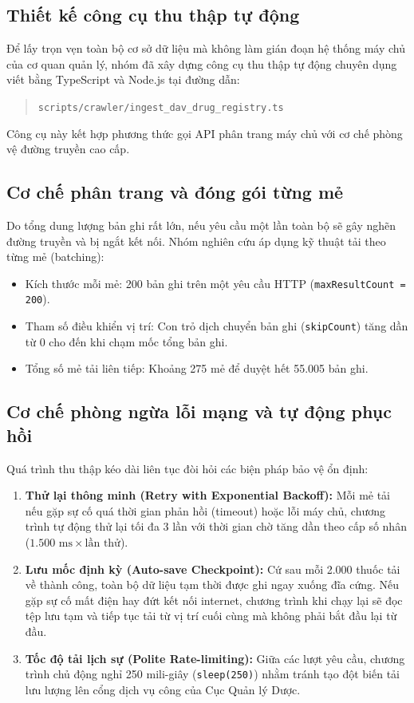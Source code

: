 \documentclass[12pt,a4paper]{article}
\begin{document}
\subsection{Thiết kế công cụ thu thập tự động}
Để lấy trọn vẹn toàn bộ cơ sở dữ liệu mà không làm gián đoạn hệ thống máy chủ của cơ quan quản lý, nhóm đã xây dựng công cụ thu thập tự động chuyên dụng viết bằng TypeScript và Node.js tại đường dẫn:
\begin{quote}
    \texttt{scripts/crawler/ingest\_dav\_drug\_registry.ts}
\end{quote}

Công cụ này kết hợp phương thức gọi API phân trang máy chủ với cơ chế phòng vệ đường truyền cao cấp.

\subsection{Cơ chế phân trang và đóng gói từng mẻ}
Do tổng dung lượng bản ghi rất lớn, nếu yêu cầu một lần toàn bộ sẽ gây nghẽn đường truyền và bị ngắt kết nối. Nhóm nghiên cứu áp dụng kỹ thuật tải theo từng mẻ (batching):
\begin{itemize}[leftmargin=1.5em]
    \item Kích thước mỗi mẻ: 200 bản ghi trên một yêu cầu HTTP (\texttt{maxResultCount = 200}).
    \item Tham số điều khiển vị trí: Con trỏ dịch chuyển bản ghi (\texttt{skipCount}) tăng dần từ 0 cho đến khi chạm mốc tổng bản ghi.
    \item Tổng số mẻ tải liên tiếp: Khoảng 275 mẻ để duyệt hết 55.005 bản ghi.
\end{itemize}

\subsection{Cơ chế phòng ngừa lỗi mạng và tự động phục hồi}
Quá trình thu thập kéo dài liên tục đòi hỏi các biện pháp bảo vệ ổn định:
\begin{enumerate}[leftmargin=1.5em]
    \item \textbf{Thử lại thông minh (Retry with Exponential Backoff):} Mỗi mẻ tải nếu gặp sự cố quá thời gian phản hồi (timeout) hoặc lỗi máy chủ, chương trình tự động thử lại tối đa 3 lần với thời gian chờ tăng dần theo cấp số nhân ($1.500\text{ ms} \times \text{lần thử}$).
    \item \textbf{Lưu mốc định kỳ (Auto-save Checkpoint):} Cứ sau mỗi 2.000 thuốc tải về thành công, toàn bộ dữ liệu tạm thời được ghi ngay xuống đĩa cứng. Nếu gặp sự cố mất điện hay đứt kết nối internet, chương trình khi chạy lại sẽ đọc tệp lưu tạm và tiếp tục tải từ vị trí cuối cùng mà không phải bắt đầu lại từ đầu.
    \item \textbf{Tốc độ tải lịch sự (Polite Rate-limiting):} Giữa các lượt yêu cầu, chương trình chủ động nghỉ 250 mili-giây (\texttt{sleep(250)}) nhằm tránh tạo đột biến tải lưu lượng lên cổng dịch vụ công của Cục Quản lý Dược.
\end{enumerate}
\end{document}
